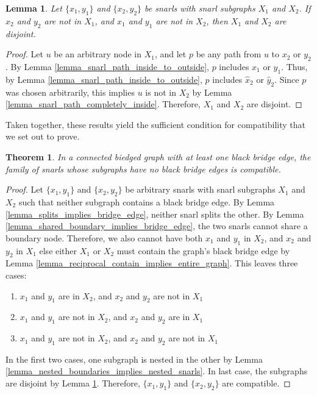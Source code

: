\documentclass[11pt]{ucthesis}
\newtheorem{theorem}{Theorem}
\newtheorem{lemma}{Lemma}
\newtheorem*{proof}{Proof}
\begin{document}
\begin{lemma}
	Let $\{x_1, y_1\}$ and $\{x_2, y_2\}$ be snarls with snarl subgraphs $X_1$ and $X_2$. If $x_2$ and $y_2$ are not in $X_1$, and $x_1$ and $y_1$ are not in $X_2$, then $X_1$ and $X_2$ are disjoint.
	\label{lemma_disjoint_boundaries_implies_disjoint}
\end{lemma}
\begin{proof}
	Let $u$ be an arbitrary node in $X_1$, and let $p$ be any path from $u$ to $x_2$ or $y_2$. By Lemma \ref{lemma_snarl_path_inside_to_outside}, $p$ includes $x_1$ or $y_1$. Thus, by Lemma \ref{lemma_snarl_path_inside_to_outside}, $p$ includes $\hat x_2$ or $\hat y_2$. Since $p$ was chosen arbitrarily, this implies $u$ is not in $X_2$ by Lemma \ref{lemma_snarl_path_completely_inside}. Therefore, $X_1$ and $X_2$ are disjoint.
\end{proof}

Taken together, these results yield the sufficient condition for compatibility that we set out to prove.
{
\renewcommand{\thetheorem}{\ref{theorem_no_bridges_is_compatible}}
\begin{theorem}
	In a connected biedged graph with at least one black bridge edge, the family of snarls whose subgraphs have no black bridge edges is compatible.
\end{theorem}
}
\begin{proof}
	Let $\{x_1, y_1\}$ and $\{x_2, y_2\}$ be arbitrary snarls with snarl subgraphs $X_1$ and $X_2$ such that neither subgraph contains a black bridge edge. By Lemma \ref{lemma_splits_implies_bridge_edge}, neither snarl splits the other. By Lemma \ref{lemma_shared_boundary_implies_bridge_edge}, the two snarls cannot share a boundary node. Therefore, we also cannot have both $x_1$ and $y_1$ in $X_2$, and $x_2$ and $y_2$ in $X_1$ else either $X_1$ or $X_2$ must contain the graph's black bridge edge by Lemma \ref{lemma_reciprocal_contain_implies_entire_graph}. This leaves three cases: 
	
	\begin{enumerate}
		\item $x_1$ and $y_1$ are in $X_2$, and $x_2$ and $y_2$ are not in $X_1$
		\item $x_1$ and $y_1$ are not in $X_2$, and $x_2$ and $y_2$ are in $X_1$
		\item $x_1$ and $y_1$ are not in $X_2$, and $x_2$ and $y_2$ are not in $X_1$
	\end{enumerate} 
	
	In the first two cases, one subgraph is nested in the other by Lemma \ref{lemma_nested_boundaries_implies_nested_snarls}. In last case, the subgraphs are disjoint by Lemma \ref{lemma_disjoint_boundaries_implies_disjoint}. Therefore, $\{x_1, y_1\}$ and $\{x_2, y_2\}$ are compatible.
\end{proof}
\end{document}
